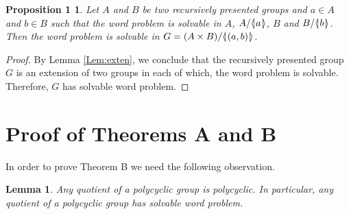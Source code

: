 \documentclass[12pt, a4paper]{amsart}
\newtheorem*{ThmD}{Proposition 1}
\newtheorem{Lem}[Thm]{Lemma}
\theoremstyle{remark}
\theoremstyle{definition}
\begin{document}
\begin{ThmD} Let $A$ and $B$ be two recursively presented groups and $a\in A$ and $b\in B$ such that the word problem is solvable in $A$, $A/{{\langle}{\mkern-3.7mu}{\lvert}{\mkern1.2mu}{{a}}{\mkern1.2mu}{\rvert}{\mkern-3.7mu}{\rangle}}$, $B$ and $B/{{\langle}{\mkern-3.7mu}{\lvert}{\mkern1.2mu}{{b}}{\mkern1.2mu}{\rvert}{\mkern-3.7mu}{\rangle}}$. Then the word problem is solvable in  $G=(A \times B)/{{\langle}{\mkern-3.7mu}{\lvert}{\mkern1.2mu}{{(a,b)}}{\mkern1.2mu}{\rvert}{\mkern-3.7mu}{\rangle}}$. 
\end{ThmD} 
\begin{proof}
By Lemma \ref{Lem:exten}, we conclude that the recursively presented group $G$ is an extension of two groups in each of which, the word problem is solvable. Therefore, $G$ has solvable word problem.

\end{proof}

\section{Proof of  Theorems A and B}\label{sec:ThmB}

In order to prove Theorem B we need the following observation.
\begin{Lem}\label{lem:polyfg}
Any quotient of a polycyclic group is polycyclic. 
In particular, any quotient of a polycyclic group has solvable word problem.
\end{Lem}
\end{document}
